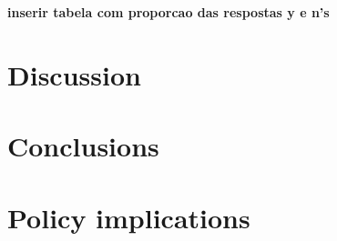 \documentclass[smallextended]{svjour3}       %
\begin{document}
\textbf{inserir tabela com proporcao das respostas y e n's}

\hypertarget{sec:4}{%
\section{Discussion}\label{sec:4}}

\hypertarget{sec:5}{%
\section{Conclusions}\label{sec:5}}

\hypertarget{sec:6}{%
\section{Policy implications}\label{sec:6}}




\end{document}

